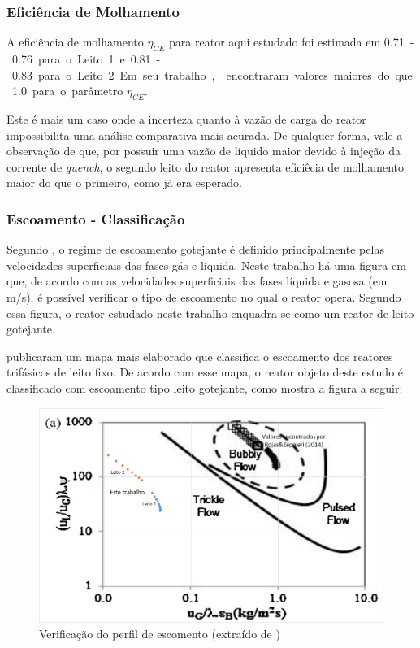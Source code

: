\subsubsection{Eficiência de Molhamento} \label{eficienciademolhamento}

A eficiência de molhamento $\eta_{CE}$ para reator aqui estudado foi estimada em
\SI{0,71}-\SI{0,76} para o Leito 1 e \SI{0,81}-\SI{0,83} para o Leito 2. Em seu
trabalho,  encontraram valores maiores do que \SI{1,0}
para o parâmetro $\eta_{CE}$.

Este é mais um caso onde a incerteza quanto à vazão de carga do reator
impossibilita uma análise comparativa mais acurada. De qualquer forma, vale a
observação de que, por possuir uma vazão de líquido maior devido à injeção da
corrente de \emph{quench}, o segundo leito do reator apresenta eficiêcia de
molhamento maior do que o primeiro, como já era esperado.

\subsubsection{Escoamento - Classificação} \label{escoamentoclassificacao}

Segundo , o regime de escoamento gotejante é definido
principalmente pelas velocidades superficiais das fases gás e líquida. Neste
trabalho há uma figura em que, de acordo com as velocidades superficiais das
fases líquida e gasosa (em \si{m/s}), é possível verificar o tipo de escoamento
no qual o reator opera. Segundo essa figura, o reator estudado neste trabalho
enquadra-se como um reator de leito gotejante.

 publicaram um mapa mais elaborado que classifica o
escoamento dos reatores trifásicos de leito fixo. De acordo com esse mapa, o
reator objeto deste estudo é classificado com escoamento tipo leito
gotejante, como mostra a figura a seguir:

\begin{figure}[htb]
\centering
\includegraphics[scale=0.4]{images/Chap4/validacaoescoamento.png}
\caption{Verificação do perfil de escomento (extraído de
)}
\label{fig:validacaoescoamento}
\end{figure}

